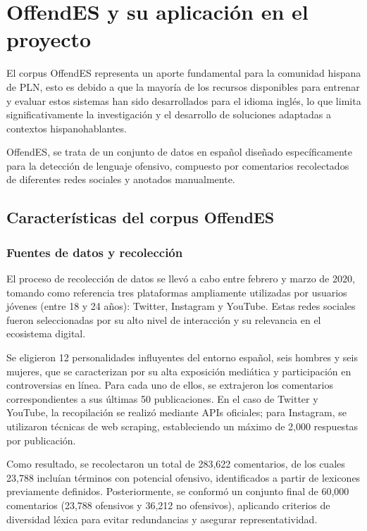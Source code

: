 \chapter{OffendES y su aplicación en el proyecto}

El corpus OffendES representa un aporte fundamental para la comunidad hispana de PLN, esto es debido a que la mayoría de los recursos disponibles para entrenar y evaluar estos sistemas han sido desarrollados para el idioma inglés, lo que limita significativamente la investigación y el desarrollo de soluciones adaptadas a contextos hispanohablantes.

OffendES, se trata de un conjunto de datos en español diseñado específicamente para la detección de lenguaje ofensivo, compuesto por comentarios recolectados de diferentes redes sociales y anotados manualmente.

\section{Características del corpus OffendES}

\subsection{Fuentes de datos y recolección}

El proceso de recolección de datos se llevó a cabo entre febrero y marzo de 2020, tomando como referencia tres plataformas ampliamente utilizadas por usuarios jóvenes (entre 18 y 24 años): Twitter, Instagram y YouTube. Estas redes sociales fueron seleccionadas por su alto nivel de interacción y su relevancia en el ecosistema digital.

Se eligieron 12 personalidades influyentes del entorno español, seis hombres y seis mujeres, que se caracterizan por su alta exposición mediática y participación en controversias en línea. Para cada uno de ellos, se extrajeron los comentarios correspondientes a sus últimas 50 publicaciones. En el caso de Twitter y YouTube, la recopilación se realizó mediante APIs oficiales; para Instagram, se utilizaron técnicas de web scraping, estableciendo un máximo de 2,000 respuestas por publicación.

Como resultado, se recolectaron un total de 283,622 comentarios, de los cuales 23,788 incluían términos con potencial ofensivo, identificados a partir de lexicones previamente definidos. Posteriormente, se conformó un conjunto final de 60,000 comentarios (23,788 ofensivos y 36,212 no ofensivos), aplicando criterios de diversidad léxica para evitar redundancias y asegurar representatividad.

